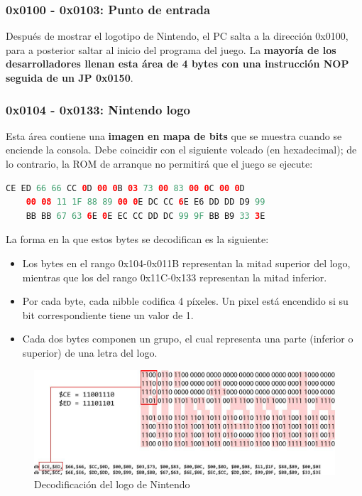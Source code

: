 \subsubsection{0x0100 - 0x0103: Punto de entrada}
Después de mostrar el logotipo de Nintendo, el PC salta a la dirección 0x0100, para a posterior saltar al inicio del programa del juego. La \textbf{mayoría de los desarrolladores llenan esta área de 4 bytes con una instrucción NOP seguida de un JP 0x0150}.

\subsubsection{0x0104 - 0x0133: Nintendo logo}
Esta área contiene una \textbf{imagen en mapa de bits} que se muestra cuando se enciende la consola. Debe coincidir con el siguiente volcado (en hexadecimal); de lo contrario, la ROM de arranque no permitirá que el juego se ejecute:

\begin{lstlisting}[language=Kotlin, caption={Nintendo Logo - Mapa de Bits}, label={code:nintendologobits}]
    CE ED 66 66 CC 0D 00 0B 03 73 00 83 00 0C 00 0D
    00 08 11 1F 88 89 00 0E DC CC 6E E6 DD DD D9 99
    BB BB 67 63 6E 0E EC CC DD DC 99 9F BB B9 33 3E
\end{lstlisting}

La forma en la que estos bytes se decodifican es la siguiente:
\begin{itemize}
    \item Los bytes en el rango 0x104-0x011B representan la mitad superior del logo, mientras que los del rango 0x11C-0x133 representan la mitad inferior.
    \item Por cada byte, cada nibble codifica 4 píxeles. Un pixel está encendido si su bit correspondiente tiene un valor de 1.
    \item Cada dos bytes componen un grupo, el cual representa una parte (inferior o superior) de una letra del logo.
\end{itemize}

\begin{figure}[H]
\centering
\includegraphics[width=1\textwidth]{include/images/dibujado_logo_n.jpg}
\caption{Decodificación del logo de Nintendo}
\label{figure:decodednlogo}
\end{figure}

